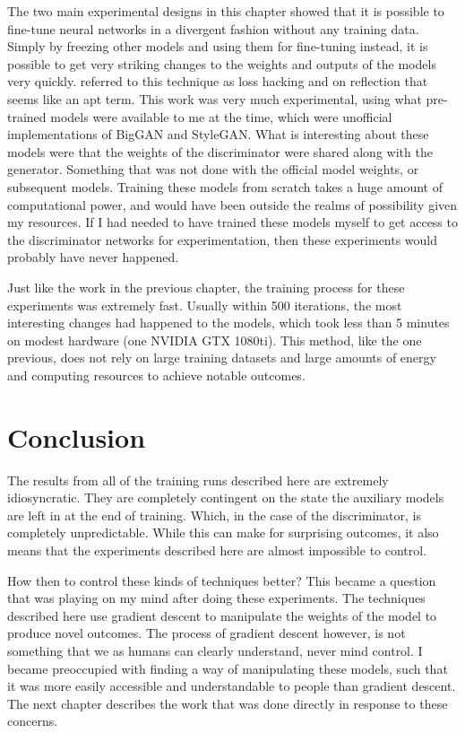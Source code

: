 The two main experimental designs in this chapter showed that it is possible to fine-tune neural networks in a divergent fashion without any training data. 
Simply by freezing other models and using them for fine-tuning instead, it is possible to get very striking changes to the weights and outputs of the models very quickly. 
\cite{berns2020bridging} referred to this technique as loss hacking and on reflection that seems like an apt term. 
This work was very much experimental, using what pre-trained models were available to me at the time, which were unofficial implementations of BigGAN and StyleGAN. 
What is interesting about these models were that the weights of the discriminator were shared along with the generator. 
Something that was not done with the official model weights, or subsequent models. 
Training these models from scratch takes a huge amount of computational power, and would have been outside the realms of possibility given my resources. 
If I had needed to have trained these models myself to get access to the discriminator networks for experimentation, then these experiments would probably have never happened. 

Just like the work in the previous chapter, the training process for these experiments was extremely fast. 
Usually within 500 iterations, the most interesting changes had happened to the models, which took less than 5 minutes on modest hardware (one NVIDIA GTX 1080ti). 
This method, like the one previous, does not rely on large training datasets and large amounts of energy and computing resources to achieve notable outcomes. 


\section{Conclusion}

The results from all of the training runs described here are extremely idiosyncratic. 
They are completely contingent on the state the auxiliary models are left in at the end of training. 
Which, in the case of the discriminator, is completely unpredictable. 
While this can make for surprising outcomes, it also means that the experiments described here are almost impossible to control. 

How then to control these kinds of techniques better? 
This became a question that was playing on my mind after doing these experiments. 
The techniques described here use gradient descent to manipulate the weights of the model to produce novel outcomes. 
The process of gradient descent however, is not something that we as humans can clearly understand, never mind control. 
I became preoccupied with finding a way of manipulating these models, such that it was more easily accessible and understandable to people than gradient descent. 
The next chapter describes the work that was done directly in response to these concerns.

